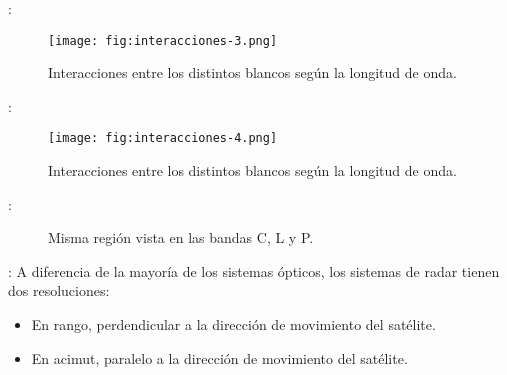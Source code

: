 \begin{frame}{\secname : \subsecname}
    \begin{figure}
      \centering
      \texttt{[image: fig:interacciones-3.png]}
      \caption{Interacciones entre los distintos blancos según la longitud de onda.}
      \label{}
    \end{figure}
\end{frame}

\begin{frame}{\secname : \subsecname}
    \begin{figure}
      \centering
      \texttt{[image: fig:interacciones-4.png]}
      \caption{Interacciones entre los distintos blancos según la longitud de onda.}
      \label{}
    \end{figure}
\end{frame}


\begin{frame}{\secname : \subsecname}
    \begin{figure}
    \centering
    \hspace{1cm}
    \hspace{1cm}
    \caption{Misma región vista en las bandas C, L y P.}
    \end{figure}
\end{frame}

\begin{frame}{\secname : \subsecname}
    A diferencia de la mayoría de los sistemas ópticos, los sistemas de radar tienen dos resoluciones:
    \begin{itemize}
      \item En rango, perdendicular a la dirección de movimiento del satélite.
      \item En acimut, paralelo a la dirección de movimiento del satélite.
    \end{itemize}
\end{frame}

